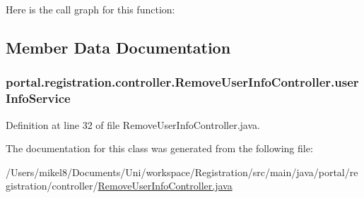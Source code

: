 Here is the call graph for this function:




\subsection{Member Data Documentation}
\hypertarget{classportal_1_1registration_1_1controller_1_1RemoveUserInfoController_aa47f9e167dfc7634fd39928b21c05390}{
\subsubsection[{userInfoService}]{ {\bf portal.registration.controller.RemoveUserInfoController.userInfoService}}}
\label{classportal_1_1registration_1_1controller_1_1RemoveUserInfoController_aa47f9e167dfc7634fd39928b21c05390}


Definition at line 32 of file RemoveUserInfoController.java.



The documentation for this class was generated from the following file:\begin{DoxyCompactItemize}
\item 
/Users/mikel8/Documents/Uni/workspace/Registration/src/main/java/portal/registration/controller/\hyperlink{RemoveUserInfoController_8java}{RemoveUserInfoController.java}\end{DoxyCompactItemize}
